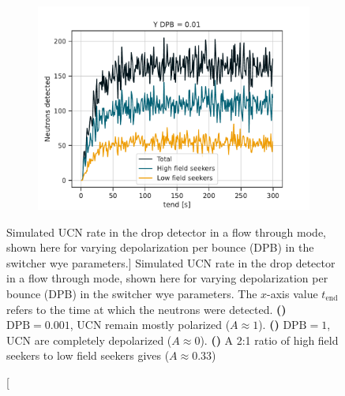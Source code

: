 \begin{figure}
\begin{subfigure}{.5\textwidth}
  \includegraphics[width=\textwidth]{figures/flow_through_dpb_0.01.pdf}
  \caption{}\label{subfig:dpb_01}
\end{subfigure}
\caption
[Simulated UCN rate in the drop detector in a flow through mode, shown here for varying depolarization per bounce (DPB) in the switcher wye parameters.]
{Simulated UCN rate in the drop detector in a flow through mode, shown here for varying depolarization per bounce (DPB) in the switcher wye parameters. The $x$-axis value $t_\text{end}$ refers to the time at which the neutrons were detected. \textbf{()} $\text{DPB}=0.001$, UCN remain mostly polarized ($A\approx 1$). \textbf{()} $\text{DPB}=1$, UCN are completely depolarized ($A\approx 0$). \textbf{()} A 2:1 ratio of high field seekers to low field seekers gives ($A\approx 0.33$)}
\label{fig:dpb_flow_through}
\end{figure}



